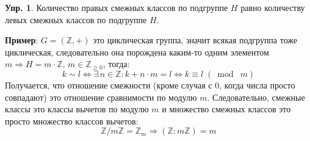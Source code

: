 \documentclass[12pt]{article}
\newcommand{\MZ}{\mathbb{Z}}
\theoremstyle{definition}
\newtheorem{exrc}{Упр.}
\newcommand{\modn}[3]{#1 \equiv #2 \; (\bmod \; #3)}
\begin{document}
\begin{exrc}
	Количество правых смежных классов по подгруппе $H$ равно количеству левых смежных классов по подгруппе $H$.
\end{exrc}

\textbf{Пример}: $G = (\MZ, +)$ это циклическая группа, значит всякая подгруппа тоже циклическая, следовательно она порождена каким-то одним элементом $m \Rightarrow H = m{\cdot}\MZ, \, m \in \MZ_{\geq 0}$, тогда: 
$$
	k \sim l \Leftrightarrow \exists \, n \in \MZ \colon k + n{\cdot}m = l\Leftrightarrow \modn{k}{l}{m}
$$
Получается, что отношение смежности (кроме случая с $0$, когда числа просто совпадают) это отношение сравнимости по модулю $m$. Следовательно, смежные классы это классы вычетов по модулю $m$ и множество смежных классов это просто множество классов вычетов:
$$
	\MZ/m\MZ = \MZ_m \Rightarrow (\MZ \colon m\MZ) = m
$$
\end{document}
